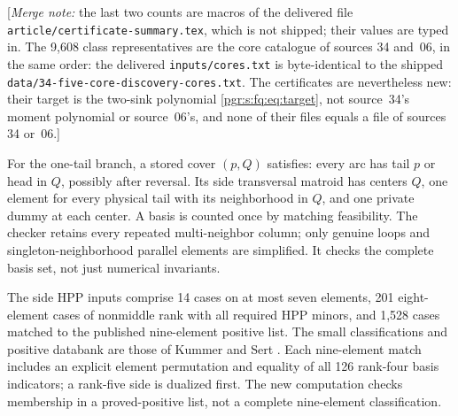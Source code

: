 \documentclass[11pt]{article}
\numberwithin{equation}{section}
\theoremstyle{definition}\newtheorem{definition}[theorem]{Definition}\newtheorem{remark}[theorem]{Remark}
\newcommand{\mnote}[1]{[\textit{Merge note:} #1]}
\begin{document}
\mnote{the last two counts are macros of the delivered file
\nolinkurl{article/certificate-summary.tex}, which is not shipped; their
values are typed in. The 9,608 class representatives are the core
catalogue of sources 34 and~06, in the same order: the delivered
\nolinkurl{inputs/cores.txt} is byte-identical to the shipped
\nolinkurl{data/34-five-core-discovery-cores.txt}. The certificates are
nevertheless new: their target is the two-sink polynomial
\eqref{pgr:s:fq:eq:target}, not source~34's moment polynomial or
source~06's, and none of their files equals a file of sources 34 or~06.}

For the one-tail branch, a stored cover $(p,Q)$ satisfies: every arc has tail $p$ or head in $Q$, possibly after reversal. Its side transversal matroid has centers $Q$, one element for every physical tail with its neighborhood in $Q$, and one private dummy at each center. A basis is counted once by matching feasibility. The checker retains every repeated multi-neighbor column; only genuine loops and singleton-neighborhood parallel elements are simplified. It checks the complete basis set, not just numerical invariants.

The side HPP inputs comprise 14 cases on at most seven elements, 201 eight-element cases of nonmiddle rank with all required HPP minors, and 1,528 cases matched to the published nine-element positive list. The small classifications and positive databank are those of Kummer and Sert \cite{KS,KSdata}. Each nine-element match includes an explicit element permutation and equality of all 126 rank-four basis indicators; a rank-five side is dualized first. The new computation checks membership in a proved-positive list, not a complete nine-element classification.
\end{document}
